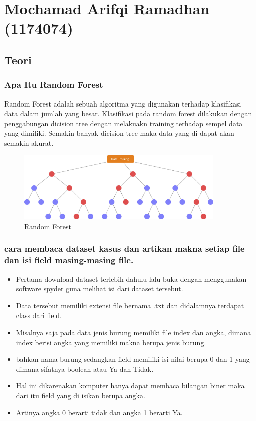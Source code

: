 \section{Mochamad Arifqi Ramadhan (1174074)}
\subsection{Teori}

\subsubsection{Apa Itu Random Forest}

\hfill\break
Random Forest adalah sebuah algoritma yang digunakan terhadap klasifikasi data dalam jumlah yang besar. Klasifikasi pada random forest dilakukan dengan penggabungan dicision tree dengan melakuakn training terhadap sempel data yang dimiliki. Semakin banyak dicision tree maka data yang di dapat akan
semakin akurat.
\begin{figure}[H]
\centerline{\includegraphics[width=10cm]{figures/1174074/3/1.jpg}}
\caption{Random Forest}
\label{labelgambar}
\end{figure}

\subsubsection{cara membaca dataset kasus dan artikan makna setiap file dan isi field masing-masing file.}

\hfill\break
\begin{itemize}
\item Pertama download dataset terlebih dahulu lalu buka dengan menggunakan software spyder guna melihat isi dari dataset tersebut.

\item Data tersebut memiliki extensi file bernama .txt dan didalamnya terdapat class dari field.

\item Misalnya saja pada data jenis burung memiliki file index dan angka, dimana index berisi angka yang memiliki makna berupa jenis burung.

\item bahkan nama burung sedangkan field memiliki isi nilai berupa 0 dan 1 yang dimana sifatnya boolean atau Ya dan Tidak.

\item Hal ini dikarenakan komputer hanya dapat membaca bilangan biner maka dari itu field yang di isikan berupa angka.

\item Artinya angka 0 berarti tidak dan angka 1 berarti Ya.
\end{itemize}


